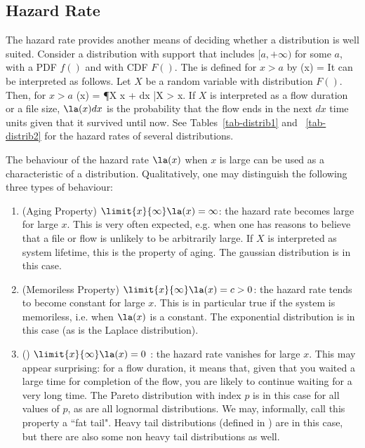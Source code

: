 \subsection{Hazard Rate}
\label{sec-haz-rat} The hazard rate provides
another means of deciding whether a distribution
is well suited. Consider a distribution with
support that includes $[a, + \infty)$ for some
$a$, with a PDF $f()$ and with CDF $F()$. The
 is defined for $x
>a$ by
 \ben
\la(x) = 
 \een
It can be interpreted as follows. Let $X$ be a
random variable with distribution $F()$. Then,
for $x>a$
 \ben
\la(x) = \P\lp X \leq  x
+ dx \left|X
> x\right. \rp
 \een
If $X$ is interpreted as a flow duration or a file size,
$\la(x) dx$ is the probability that the flow ends in the next
$dx$ time units given that it survived until now. See
Tables~\ref{tab-distrib1} and ~\ref{tab-distrib2} for the
hazard rates of several distributions.

The behaviour of the hazard rate $\la(x)$ when $x$ is large can
be used as a characteristic of a distribution. Qualitatively,
one may distinguish the following three types of behaviour:
\doitemsep
\begin{enumerate}
  \item (Aging Property) $\limit{x}{\infty}\la(x) =
      \infty$: the hazard rate becomes large for large $x$.
      This is very often expected, e.g. when one has
      reasons to believe that a file or flow is unlikely to
      be arbitrarily large. If $X$ is interpreted as system
      lifetime, this is the property of aging. The gaussian
      distribution is in this case.
  \item (Memoriless Property) $\limit{x}{\infty}\la(x) =
      c>0$: the hazard rate tends to become constant for
      large $x$. This is in particular true if the system
      is memoriless, i.e. when $\la(x)$ is a constant. The
      exponential distribution is in this case (as is the
      Laplace distribution).
  \item () $\limit{x}{\infty}\la(x) = 0$ : the
      hazard rate vanishes for large $x$. This may appear
      surprising: for a flow duration, it means that, given
      that you waited a large time for completion of the
      flow, you are likely to continue waiting for a very
      long time. The Pareto distribution with index $p$ is
      in this case for all values of $p$, as are all
      lognormal distributions. We may, informally, call
      this property a ``fat tail". Heavy tail distributions
      (defined in ) are in this case, but
      there are also some non heavy tail distributions as
      well.
\end{enumerate}
\noitemsep

